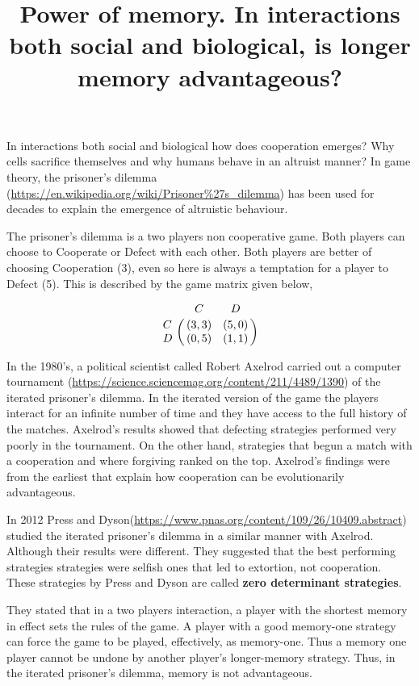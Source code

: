 \documentclass{article}
\title{Power of memory. In interactions both social and biological, is longer memory
advantageous?}
\begin{document}
\maketitle

In interactions both social and biological how does cooperation emerges? Why
cells sacrifice themselves and why humans behave in an altruist manner? In
game theory, the prisoner's dilemma (\url{https://en.wikipedia.org/wiki/Prisoner%27s_dilemma})
has been used for decades to explain the emergence of altruistic behaviour.

The prisoner's dilemma is a two players non cooperative game. Both players can
choose to Cooperate or Defect with each other. Both players are better of choosing
Cooperation (3), even so here is always a temptation for a player to Defect (5).
This is described by the game matrix given below,

%     

\begin{equation}\label{eq:payoff_matrix_symb}
     \bordermatrix{~ & C & D \cr
                      C & (3, 3) & (5, 0) \cr
                      D & (0, 5) & (1, 1) \cr}
    \end{equation}


In the 1980's, a political scientist called Robert Axelrod carried out a
computer tournament (\url{https://science.sciencemag.org/content/211/4489/1390})
of the iterated prisoner's dilemma. In the iterated version of the game the players
interact for an infinite number of time and they have access to the full history
of the matches. Axelrod's results showed that defecting strategies performed
very poorly in the tournament. On the other hand, strategies that begun a match
with a cooperation and where forgiving ranked on the top. Axelrod's findings
were from the earliest that explain how cooperation can be evolutionarily advantageous.

In 2012 Press and Dyson(\url{https://www.pnas.org/content/109/26/10409.abstract})
studied the iterated prisoner's dilemma in a similar manner with Axelrod. Although
their results were different. They suggested that the best performing strategies
strategies were selfish ones that led to extortion, not cooperation. These
strategies by Press and Dyson are called \textbf{zero determinant strategies}.

They stated that in a two players interaction, a player with the shortest memory
in effect sets the rules of the game. A player with a good memory-one strategy
can force the game to be played, effectively, as memory-one. Thus a 
memory one player cannot be undone by another player's longer-memory strategy.
Thus, in the iterated prisoner's dilemma, memory is not advantageous.
\end{document}
